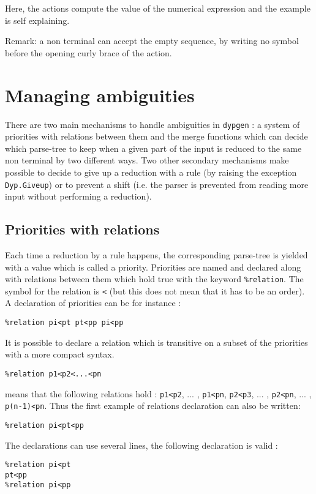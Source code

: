 \documentclass[12pt]{article}
\begin{document}
{Here, the actions compute the value of the numerical expression and
the example is self explaining.

Remark: a non terminal can accept the empty sequence, by writing no
symbol before the opening curly brace of the action.

\section{Managing ambiguities}\label{ambiguities}

There are two main mechanisms to handle ambiguities in \texttt{dypgen} : a system of priorities with relations between them and the merge functions which can decide which parse-tree to keep when a given part of the input is reduced to the same non terminal by two different ways. Two other secondary mechanisms make possible to decide to give up a reduction with a rule (by raising the exception \texttt{Dyp.Giveup}) or to prevent a shift (i.e. the parser is prevented from reading more input without performing a reduction).

\subsection{Priorities with relations}\label{priority}

Each time a reduction by a rule happens, the corresponding parse-tree is yielded with a value which is called a priority.
Priorities are named and declared along with relations between them which hold true with the keyword \texttt{\%relation}. The symbol for the relation is \texttt{<} (but this does not mean that it has to be an order). A declaration of priorities can be for instance :
\begin{verbatim}
%relation pi<pt pt<pp pi<pp
\end{verbatim}
It is possible to declare a relation which is transitive on a subset of the priorities with a more compact syntax.
\begin{verbatim}
%relation p1<p2<...<pn
\end{verbatim}
means that the following relations hold : \texttt{p1<p2}, ... , \texttt{p1<pn}, \texttt{p2<p3}, ... , \texttt{p2<pn}, ... , \texttt{p(n-1)<pn}. Thus the first example of relations declaration can also be written:
\begin{verbatim}
%relation pi<pt<pp
\end{verbatim}
The declarations can use several lines, the following declaration is valid :
\begin{verbatim}
%relation pi<pt
pt<pp
%relation pi<pp
\end{verbatim}

}
\end{document}
